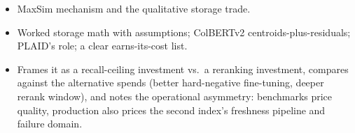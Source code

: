 \begin{interviewq}

\goodgreat
\begin{itemize}
    \item {} MaxSim mechanism and the qualitative storage trade.
    \item {} Worked storage math with assumptions; ColBERTv2 centroids-plus-residuals; PLAID's role; a clear earns-its-cost list.
    \item {} Frames it as a recall-ceiling investment vs.\ a reranking investment, compares against the alternative spends (better hard-negative fine-tuning, deeper rerank window), and notes the operational asymmetry: benchmarks price quality, production also prices the second index's freshness pipeline and failure domain.
\end{itemize}

\end{interviewq}


